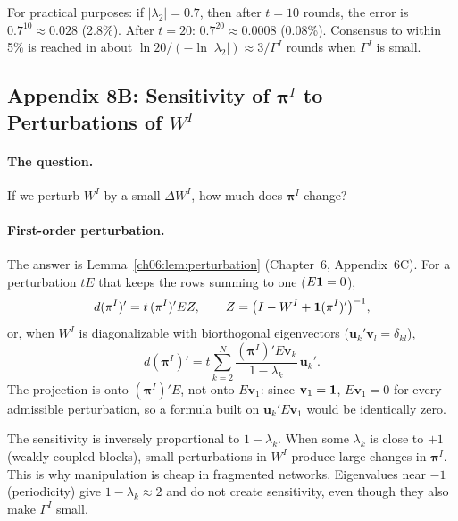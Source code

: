 \documentclass[../structural_economics_book.tex]{subfiles}
\begin{document}
For practical purposes: if $|\lambda_2| = 0.7$, then after $t = 10$ rounds, the error is $0.7^{10} \approx 0.028$ (2.8\%). After $t = 20$: $0.7^{20} \approx 0.0008$ (0.08\%). Consensus to within 5\% is reached in about $\ln 20/(-\ln|\lambda_2|) \approx 3/\Gamma^I$ rounds when $\Gamma^I$ is small.


\subsection*{Appendix 8B: Sensitivity of $\boldsymbol{\pi}^I$ to Perturbations of $W^I$}
\label{ch08:app:sensitivity}

\paragraph{The question.} If we perturb $W^I$ by a small $\Delta W^I$, how much does $\boldsymbol{\pi}^I$ change?

\paragraph{First-order perturbation.} The answer is Lemma~\ref{ch06:lem:perturbation} (Chapter~6, Appendix~6C). For a perturbation $t E$ that keeps the rows summing to one ($E\mathbf{1} = 0$),
\begin{equation}
d(\pi^I)' = t\,(\pi^I)'EZ, \qquad Z = \bigl(I - W^I + \mathbf{1}(\pi^I)'\bigr)^{-1},
\end{equation}
or, when $W^I$ is diagonalizable with biorthogonal eigenvectors ($\mathbf{u}_k'\mathbf{v}_l = \delta_{kl}$),
\begin{equation}
d(\boldsymbol{\pi}^I)' = t\sum_{k=2}^N \frac{(\boldsymbol{\pi}^I)'E\mathbf{v}_k}{1 - \lambda_k}\,\mathbf{u}_k' .
\end{equation}
The projection is onto $(\boldsymbol{\pi}^I)'E$, not onto $E\mathbf{v}_1$: since $\mathbf{v}_1 = \mathbf{1}$, $E\mathbf{v}_1 = 0$ for every admissible perturbation, so a formula built on $\mathbf{u}_k'E\mathbf{v}_1$ would be identically zero.

The sensitivity is inversely proportional to $1 - \lambda_k$. When some $\lambda_k$ is close to $+1$ (weakly coupled blocks), small perturbations in $W^I$ produce large changes in $\boldsymbol{\pi}^I$. This is why manipulation is cheap in fragmented networks. Eigenvalues near $-1$ (periodicity) give $1 - \lambda_k \approx 2$ and do not create sensitivity, even though they also make $\Gamma^I$ small.
\end{document}
